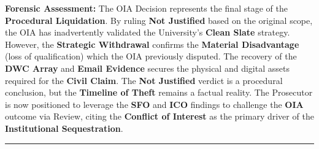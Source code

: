 \documentclass{EMBASSY}
\begin{document}
\textbf{Forensic Assessment:} The OIA Decision represents the final stage of the \textbf{Procedural Liquidation}. By ruling \textbf{Not Justified} based on the original scope, the OIA has inadvertently validated the University’s \textbf{Clean Slate} strategy. However, the \textbf{Strategic Withdrawal} confirms the \textbf{Material Disadvantage} (loss of qualification) which the OIA previously disputed. The recovery of the \textbf{DWC Array} and \textbf{Email Evidence} secures the physical and digital assets required for the \textbf{Civil Claim}. The \textbf{Not Justified} verdict is a procedural conclusion, but the \textbf{Timeline of Theft} remains a factual reality. The Prosecutor is now positioned to leverage the \textbf{SFO} and \textbf{ICO} findings to challenge the \textbf{OIA} outcome via Review, citing the \textbf{Conflict of Interest} as the primary driver of the \textbf{Institutional Sequestration}.

\hrule

\newpage
\end{document}

